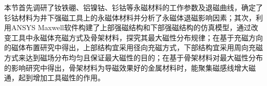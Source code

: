 本节首先调研了钕铁硼、铝镍钴、钐钴等永磁材料的工作参数及退磁曲线，确定了钐钴材料为井下强磁工具上的永磁体材料并分析了永磁体退磁影响因素；其次，利用ANSYS Maxwell软件构建了上部强磁结构和下部强磁结构的仿真模型，通过改变工具中永磁体充磁方式及骨架材料，探究其最大磁性分布规律；在基于充磁方向的磁体布置研究中得出，上部结构宜采用径向充磁方式，下部结构宜采用周向充磁方式来达到磁场分布均匀且保证最大磁性的目的；在基于骨架材料对最大磁性分布的影响研究中得出，骨架材料为导磁效果好的金属材料时，能聚集磁感线增大磁通，起到增加工具磁性的作用。




























































